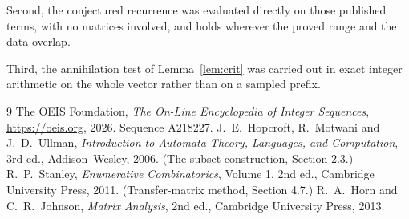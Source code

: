 \documentclass[11pt,a4paper]{article}
\theoremstyle{plain}
\theoremstyle{definition}
\begin{document}
Second, the conjectured recurrence was evaluated directly on those published terms, with no
matrices involved, and holds wherever the proved range and the data overlap.

Third, the annihilation test of Lemma~\ref{lem:crit} was carried out in exact integer
arithmetic on the whole vector rather than on a sampled prefix.

\begin{thebibliography}{9}
 The OEIS Foundation, \emph{The On-Line Encyclopedia of Integer
Sequences}, \url{https://oeis.org}, 2026. Sequence A218227.
 J.~E.~Hopcroft, R.~Motwani and J.~D.~Ullman, \emph{Introduction to Automata
Theory, Languages, and Computation}, 3rd ed., Addison--Wesley, 2006. (The subset
construction, Section 2.3.)
 R.~P.~Stanley, \emph{Enumerative Combinatorics}, Volume 1, 2nd ed.,
Cambridge University Press, 2011. (Transfer-matrix method, Section 4.7.)
 R.~A.~Horn and C.~R.~Johnson, \emph{Matrix Analysis}, 2nd ed., Cambridge
University Press, 2013.
\end{thebibliography}
\end{document}
